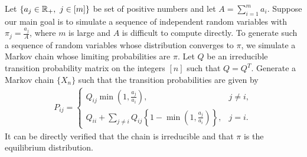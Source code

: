 \documentclass[a4paper,10pt,english]{article}
\begin{document}
\begin{exmp} Let $\{a_j \in \mathbb{R}_+,~ j \in [m]\}$ be set of positive numbers and let $A=\sum_{i=1}^{m}a_i$. Suppose our main goal is to simulate a sequence of independent random variables with $\pi_j = \frac{a_j}{A}$, where  $m$ is large and $A$ is difficult to compute directly. To generate such a sequence of random variables whose distribution converges to $\pi$, we simulate a Markov chain whose limiting probabilities are $\pi$. 
Let $Q$ be an irreducible transition probability matrix on the integers $[n]$ such that $Q = Q^T$. Generate a Markov chain $\{X_n\}$ such that the transition probabilities are given by 
\begin{align*}
P_{ij} = \begin{cases}
       Q_{ij}\min\left(1,\frac{a_j}{a_i}\right), & j \neq i,\\
       Q_{ii}+\sum_{j \neq i}Q_{ij}\left\{1-\min\left(1,\frac{a_j}{a_i}\right)\right\}, & j = i.
     \end{cases}
\end{align*} 
It can be directly verified that the chain is irreducible and that $\pi$ is the equilibrium distribution.
\end{exmp}

\end{document}
